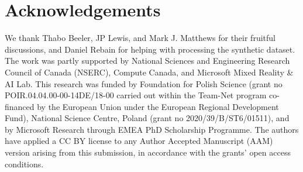 \section{Acknowledgements}
  \label{sec:conerf-ack}
  We thank Thabo Beeler, JP Lewis, and Mark J.
  Matthews for their fruitful discussions, and Daniel Rebain for helping with
  processing the synthetic dataset.
  The work was partly supported by National Sciences and Engineering Research
  Council of Canada (NSERC), Compute Canada, and Microsoft Mixed Reality \& AI
  Lab.
  This research was funded by Foundation for Polish Science (grant no
  POIR.04.04.00-00-14DE/18-00 carried out within the Team-Net program
  co-financed by the European Union under the European Regional Development
  Fund), National Science Centre, Poland (grant no 2020/39/B/ST6/01511), and
  by Microsoft Research through EMEA PhD Scholarship Programme.
  The authors have applied a CC BY license to any Author Accepted Manuscript
  (AAM) version arising from this submission, in accordance with the grants’
  open access conditions.
